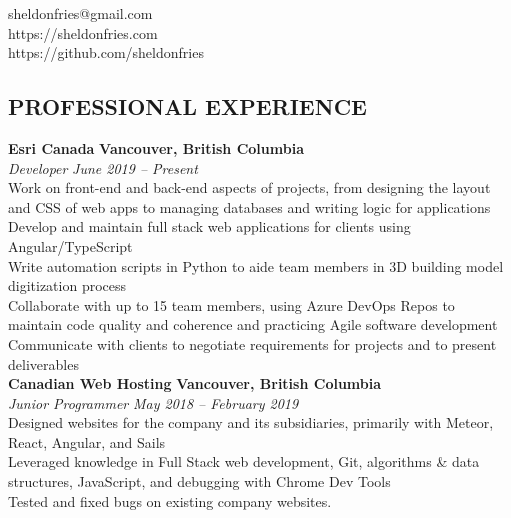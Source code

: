 \documentclass[margin,line]{resume}
\begin{document}
{
    \hfill sheldonfries@gmail.com       \vspace{0mm}\\\vspace{0mm}%
    \hfill https://sheldonfries.com           \vspace{0mm}\\\vspace{0mm}%
    \hfill https://github.com/sheldonfries \vspace{0mm}\\\vspace{-9mm}%
}

\begin{resume}

    \vspace{-3mm}

    \section{\mysidestyle \textbf{\large{P}\small{ROFESSIONAL} \large{E}\small{XPERIENCE}}}

    \textbf{\listing Esri Canada} \hfill \textbf{Vancouver, British Columbia}\vspace{2mm}\\\vspace{1mm}%
    \textsl{Developer} \hfill \textsl{June 2019 -- Present}\\
    Work on front-end and back-end aspects of projects, from designing the layout and CSS of web apps to managing databases and writing logic for applications\\
    Develop and maintain full stack web applications for clients using Angular/TypeScript\\
    Write automation scripts in Python to aide team members in 3D building model digitization process\\
    Collaborate with up to 15 team members, using Azure DevOps Repos to maintain code quality and coherence and practicing Agile software development\\
    Communicate with clients to negotiate requirements for projects and to present deliverables\\

    \textbf{\listing Canadian Web Hosting} \hfill \textbf{Vancouver, British Columbia}\vspace{2mm}\\\vspace{1mm}%
    \textsl{Junior Programmer} \hfill \textsl{May 2018 -- February 2019}\\
    Designed websites for the company and its subsidiaries, primarily with Meteor, React, Angular, and Sails\\
    Leveraged knowledge in Full Stack web development, Git, algorithms \& data structures, JavaScript, and debugging with Chrome Dev Tools\\
    Tested and fixed bugs on existing company websites.


\end{resume}
\end{document}
